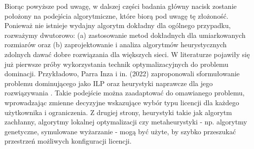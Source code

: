 Biorąc powyższe pod uwagę, w dalszej części badania główny nacisk zostanie położony na podejścia algorytmiczne, które biorą pod uwagę tę złożoność. Ponieważ nie istnieje wydajny algorytm dokładny dla ogólnego przypadku, rozważymy dwutorowo: (a) zastosowanie metod dokładnych dla umiarkowanych rozmiarów oraz (b) zaprojektowanie i analiza algorytmów heurystycznych zdolnych dawać dobre rozwiązania dla większych sieci. W literaturze pojawiły się już pierwsze próby wykorzystania technik optymalizacyjnych do problemu dominacji. Przykładowo, Parra Inza i in. (2022) zaproponowali sformułowanie problemu dominującego jako ILP oraz heurystyki naprawcze dla jego rozwiązywania \cite{PARRAINZA2024926}. Takie podejście można zaadaptować do omawianego problemu, wprowadzając zmienne decyzyjne wskazujące wybór typu licencji dla każdego użytkownika i ograniczenia. Z drugiej strony, heurystyki takie jak algorytm zachłanny, algorytmy lokalnej optymalizacji czy metaheurystyki - np. algorytmy genetyczne, symulowane wyżarzanie - mogą być użyte, by szybko przeszukać przestrzeń możliwych konfiguracji licencji.
